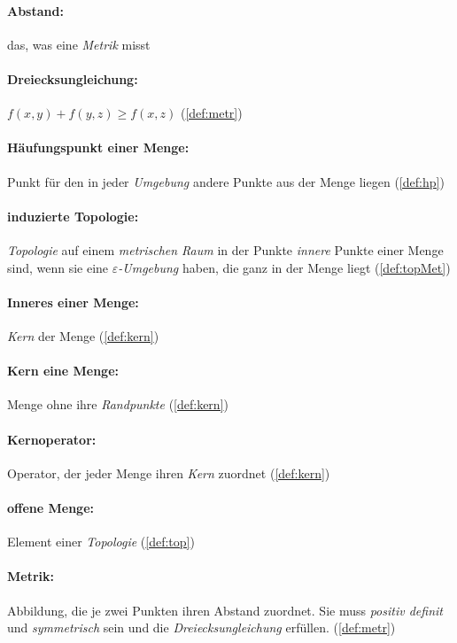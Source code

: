     \paragraph{Abstand:} das, was eine \textit{Metrik} misst
    
    \paragraph{Dreiecksungleichung:} $f(x,y) + f(y,z) \geq f(x,z)$ (\ref{def:metr})

    \paragraph{Häufungspunkt einer Menge:} Punkt für den in jeder \textit{Umgebung} andere Punkte aus der Menge liegen (\ref{def:hp})
    
    \paragraph{induzierte Topologie:} \textit{Topologie} auf einem \textit{metrischen Raum} in der Punkte \textit{innere} Punkte einer Menge sind, wenn sie eine \textit{$\varepsilon$-Umgebung} haben, die ganz in der Menge liegt (\ref{def:topMet})

    \paragraph{Inneres einer Menge:} \textit{Kern} der Menge (\ref{def:kern})

    \paragraph{Kern eine Menge:} Menge ohne ihre \textit{Randpunkte} (\ref{def:kern})

    \paragraph{Kernoperator:} Operator, der jeder Menge ihren \textit{Kern} zuordnet (\ref{def:kern})

    \paragraph{offene Menge:} Element einer \textit{Topologie} (\ref{def:top})
    
    \paragraph{Metrik:} Abbildung, die je zwei Punkten ihren Abstand zuordnet. Sie muss \textit{positiv definit} und \textit{symmetrisch} sein und die \textit{Dreiecksungleichung} erfüllen. (\ref{def:metr})
    
